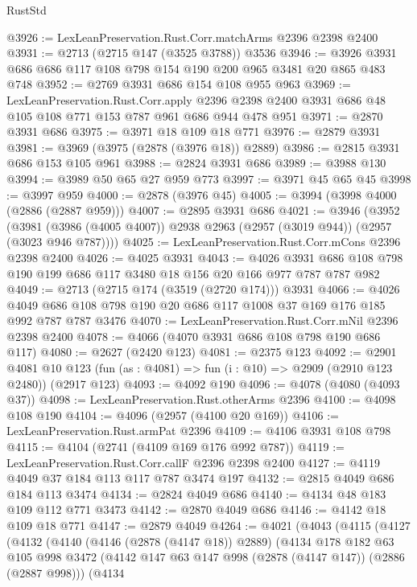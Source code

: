\begin{lexlean}{RustStd}
\begin{coremodule}
@3926 := LexLeanPreservation.Rust.Corr.matchArms @2396 @2398 @2400
@3931 := @2713 (@2715 @147 (@3525 @3788)) @3536
@3946 := @3926 @3931 @686 @686 @117 @108 @798 @154 @190 @200 @965 @3481 @20 @865 @483 @748
@3952 := @2769 @3931 @686 @154 @108 @955 @963
@3969 := LexLeanPreservation.Rust.Corr.apply
    @2396
    @2398
    @2400
    @3931
    @686
    @48
    @105
    @108
    @771
    @153
    @787
    @961
    @686
    @944
    @478
    @951
@3971 := @2870 @3931 @686
@3975 := @3971 @18 @109 @18 @771
@3976 := @2879 @3931
@3981 := @3969 (@3975 (@2878 (@3976 @18)) @2889)
@3986 := @2815 @3931 @686 @153 @105 @961
@3988 := @2824 @3931 @686
@3989 := @3988 @130
@3994 := @3989 @50 @65 @27 @959 @773
@3997 := @3971 @45 @65 @45
@3998 := @3997 @959
@4000 := @2878 (@3976 @45)
@4005 := @3994 (@3998 @4000 (@2886 (@2887 @959)))
@4007 := @2895 @3931 @686
@4021 := @3946
    (@3952 (@3981 (@3986 (@4005 @4007)) @2938 @2963 (@2957 (@3019 @944)) (@2957 (@3023 @946 @787))))
@4025 := LexLeanPreservation.Rust.Corr.mCons @2396 @2398 @2400
@4026 := @4025 @3931
@4043 := @4026 @3931 @686 @108 @798 @190 @199 @686 @117 @3480 @18 @156 @20 @166 @977 @787 @787 @982
@4049 := @2713 (@2715 @174 (@3519 (@2720 @174))) @3931
@4066 := @4026 @4049 @686 @108 @798 @190 @20 @686 @117 @1008 @37 @169 @176 @185 @992 @787 @787 @3476
@4070 := LexLeanPreservation.Rust.Corr.mNil @2396 @2398 @2400
@4078 := @4066 (@4070 @3931 @686 @108 @798 @190 @686 @117)
@4080 := @2627 (@2420 @123)
@4081 := @2375 @123
@4092 := @2901
    @4081
    @10
    @123
    (fun (as : @4081) => fun (i : @10) => @2909 (@2910 @123 @2480))
    (@2917 @123)
@4093 := @4092 @190
@4096 := @4078 (@4080 (@4093 @37))
@4098 := LexLeanPreservation.Rust.otherArms @2396
@4100 := @4098 @108 @190
@4104 := @4096 (@2957 (@4100 @20 @169))
@4106 := LexLeanPreservation.Rust.armPat @2396
@4109 := @4106 @3931 @108 @798
@4115 := @4104 (@2741 (@4109 @169 @176 @992 @787))
@4119 := LexLeanPreservation.Rust.Corr.callF @2396 @2398 @2400
@4127 := @4119 @4049 @37 @184 @113 @117 @787 @3474 @197
@4132 := @2815 @4049 @686 @184 @113 @3474
@4134 := @2824 @4049 @686
@4140 := @4134 @48 @183 @109 @112 @771 @3473
@4142 := @2870 @4049 @686
@4146 := @4142 @18 @109 @18 @771
@4147 := @2879 @4049
@4264 := @4021
    (@4043
      (@4115
        (@4127
          (@4132
            (@4140
              (@4146 (@2878 (@4147 @18)) @2889)
              (@4134
                @178
                @182
                @63
                @105
                @998
                @3472
                (@4142 @147 @63 @147 @998 (@2878 (@4147 @147)) (@2886 (@2887 @998)))
                (@4134

\end{coremodule}
\end{lexlean}
